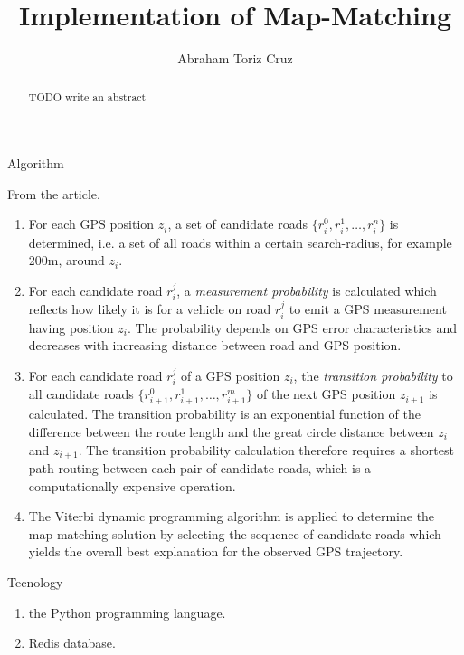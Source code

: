 \documentclass[10pt,letterpaper]{article}
\author{Abraham Toriz Cruz}
\title{Implementation of Map-Matching}
\begin{document}
\maketitle

\begin{abstract}
TODO write an abstract
\end{abstract}

\begin{section}{Algorithm}

From the article.

\begin{enumerate}
	\item For each GPS position $z_i$, a set of candidate roads $\{r_i^0, r_i^1, \dots, r_i^n\}$ is determined, i.e. a set of all roads within a certain search-radius, for example 200m, around $z_i$.

	\item For each candidate road $r_i^j$, a \emph{measurement probability} is calculated which reflects how likely it is for a vehicle on road $r_i^j$ to emit a GPS measurement having position $z_i$. The probability depends on GPS error characteristics and decreases with increasing distance between road and GPS position.

	\item For each candidate road $r_i^j$ of a GPS position $z_i$, the \emph{transition probability} to all candidate roads $\{r_{i+1}^0, r_{i+1}^1, \dots, r_{i+1}^m\}$ of the next GPS position $z_{i+1}$ is calculated. The transition probability is an exponential function of the difference between the route length and the great circle distance between $z_i$ and $z_{i+1}$. The transition probability calculation therefore requires a shortest path routing between each pair of candidate roads, which is a computationally expensive operation.

	\item The Viterbi dynamic programming algorithm is applied to determine the map-matching solution by selecting the sequence of candidate roads which yields the overall best explanation for the observed GPS trajectory.
\end{enumerate}

\end{section}

\begin{section}{Tecnology}

\begin{enumerate}
	\item the Python programming language.

	\item Redis database.
\end{enumerate}

\end{section}
\end{document}
